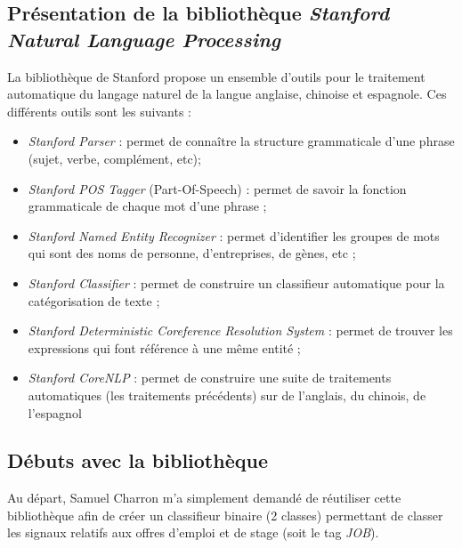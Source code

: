     \subsection{Présentation de la bibliothèque \textit{Stanford Natural Language Processing}}
        La bibliothèque de Stanford propose un ensemble d'outils pour le traitement automatique du langage naturel de la langue anglaise, chinoise et espagnole.
        Ces différents outils sont les suivants :
        \begin{itemize}
            \item \textit{Stanford Parser} : permet de connaître la structure grammaticale d'une phrase (sujet, verbe, complément, etc);
            \item \textit{Stanford POS Tagger} (Part-Of-Speech) : permet de savoir la fonction grammaticale de chaque mot d'une phrase ;
            \item \textit{Stanford Named Entity Recognizer} : permet d'identifier les groupes de mots qui sont des noms de personne, d'entreprises, de gènes, etc ;
            \item \textit{Stanford Classifier} : permet de construire un classifieur automatique pour la catégorisation de texte ;
            \item \textit{Stanford Deterministic Coreference Resolution System} : permet de trouver les expressions qui font référence à une même entité ;
            \item \textit{Stanford CoreNLP} : permet de construire une suite de traitements automatiques (les traitements précédents) sur de l'anglais, du chinois, de l'espagnol
        \end{itemize}

    \subsection{Débuts avec la bibliothèque}
        Au départ, Samuel Charron m'a simplement demandé de réutiliser cette bibliothèque afin de créer un classifieur binaire (2 classes) permettant de classer les signaux relatifs aux offres d'emploi et de stage (soit le tag \textit{JOB}).\\
